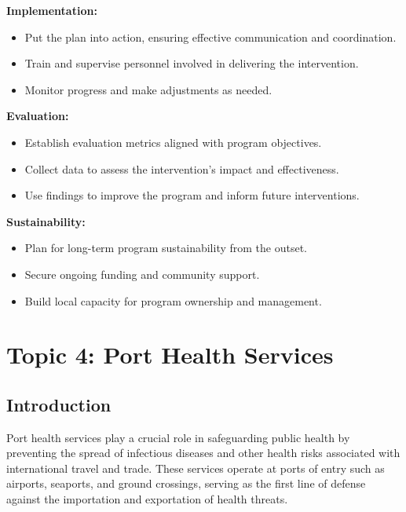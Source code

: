 \documentclass[12pt,a4paper]{article}
\begin{document}
\textbf{Implementation:}
\begin{itemize}
    \item Put the plan into action, ensuring effective communication and coordination.
    \item Train and supervise personnel involved in delivering the intervention.
    \item Monitor progress and make adjustments as needed.
\end{itemize}

\textbf{Evaluation:}
\begin{itemize}
    \item Establish evaluation metrics aligned with program objectives.
    \item Collect data to assess the intervention's impact and effectiveness.
    \item Use findings to improve the program and inform future interventions.
\end{itemize}

\textbf{Sustainability:}
\begin{itemize}
    \item Plan for long-term program sustainability from the outset.
    \item Secure ongoing funding and community support.
    \item Build local capacity for program ownership and management.
\end{itemize}

\section*{Topic 4: Port Health Services}

\subsection*{Introduction}
Port health services play a crucial role in safeguarding public health by preventing the spread of infectious diseases and other health risks associated with international travel and trade. These services operate at ports of entry such as airports, seaports, and ground crossings, serving as the first line of defense against the importation and exportation of health threats.
\end{document}
